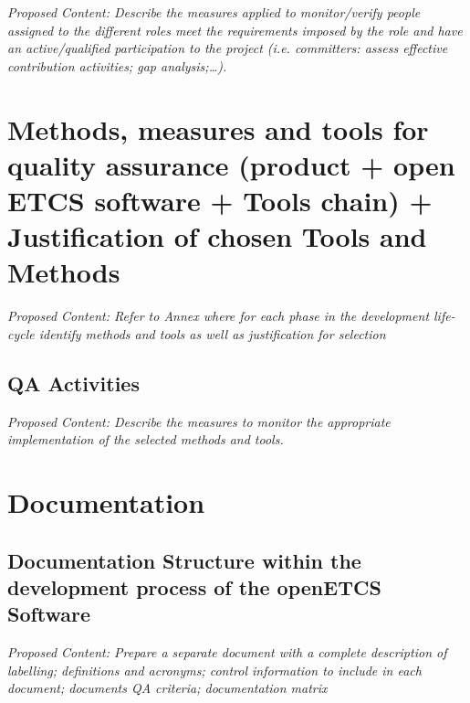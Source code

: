 \documentclass{template/openetcs_article}
\begin{document}
\textit{Proposed Content: Describe the measures applied to monitor/verify people assigned to the different roles meet the requirements imposed by the role and have an active/qualified participation to the project (i.e. committers: assess effective contribution activities; gap analysis;{\dots}).}

\section{Methods, measures and tools for quality assurance (product + open ETCS software + Tools chain) + Justification of chosen Tools and Methods}


\textit{Proposed Content: Refer to Annex where for each phase in the development life-cycle identify methods and tools as well as justification for selection}


\subsection{QA Activities}
\textit{Proposed Content: Describe the measures to monitor the appropriate implementation of the selected methods and tools.}


\section{Documentation}

\subsection{Documentation Structure within the development process of the openETCS Software}
\textit{Proposed Content: Prepare a separate document with a complete description of labelling; definitions and acronyms; control information to include in each document; documents QA criteria; documentation matrix}
\end{document}
